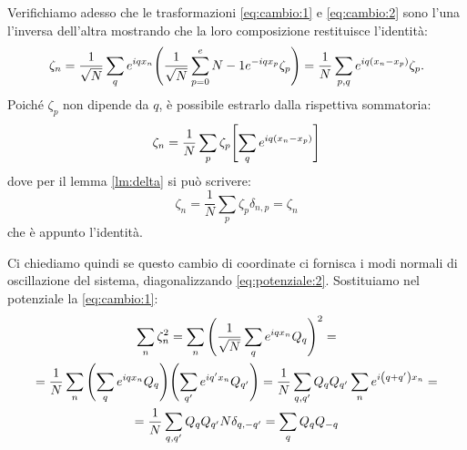     \par Verifichiamo adesso che le trasformazioni \eqref{eq:cambio:1} e \eqref{eq:cambio:2} sono l'una l'inversa dell'altra mostrando che la loro composizione restituisce l'identit\`a: $$\zeta_n=\frac{1}{\sqrt{N}}\sum_{q}e^{iqx_n}\qty(\frac{1}{\sqrt{N}}\sum_{p=0}^e{N-1}e^{-iqx_p}\zeta_p)=\frac{1}{N}\sum_{p,q}e^{iq\qty(x_n-x_p)}\zeta_p.$$ Poich\'e $\zeta_p$ non dipende da $q$, \`e possibile estrarlo dalla rispettiva sommatoria: $$\zeta_n=\frac{1}{N}\sum_p\zeta_p\qty[\sum_q e^{iq\qty(x_n-x_p)}]$$ dove per il lemma \ref{lm:delta} si pu\`o scrivere: $$\zeta_n=\frac{1}{N}\sum_p\zeta_p\delta_{n,p}=\zeta_n$$ che \`e appunto l'identit\`a. \par Ci chiediamo quindi se questo cambio di coordinate ci fornisca i modi normali di oscillazione del sistema, diagonalizzando \eqref{eq:potenziale:2}. Sostituiamo nel potenziale la \eqref{eq:cambio:1}: 
    \begin{multline*}
        \sum_n\zeta_n^2=\sum_n\qty(\frac{1}{\sqrt{N}}\sum_q e^{iqx_n}Q_q)^2=\\=\frac{1}{N}\sum_n\qty(\sum_q e^{iqx_n}Q_q)\Biggl(\sum_{q'} e^{iq'x_n}Q_{q'}\Biggr)=\frac{1}{N}\sum_{q,q'}Q_qQ_{q'}\sum_ne^{i\qty(q+q')x_n}=\\=\frac{1}{N}\sum_{q,q'}Q_qQ_{q'}N\delta_{q,-q'}=\sum_qQ_qQ_{-q}
    \end{multline*}
    
